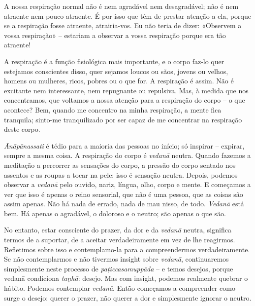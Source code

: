 A nossa respiração normal não é nem agradável nem desagradável; não é nem
atraente nem pouco atraente. É por isso que têm de prestar atenção a ela, porque
se a respiração fosse atraente, atrairia-vos. Eu não teria de dizer: «Observem
a vossa respiração» -- estariam a observar a vossa respiração porque era tão
atraente!

A respiração é a função fisiológica mais importante, e o corpo faz-lo quer
estejamos conscientes disso, quer sejamos loucos ou sãos, jovens ou velhos,
homens ou mulheres, ricos, pobres ou o que for. A respiração é assim. Não é
excitante nem interessante, nem repugnante ou repulsiva. Mas, à medida que nos
concentramos, que voltamos a nossa atenção para a respiração do corpo -- o que
acontece? Bem, quando me concentro na minha respiração, a mente fica tranquila;
sinto-me tranquilizado por ser capaz de me concentrar na respiração deste
corpo.

\emph{Ānāpānassati} é tédio para a maioria das pessoas no início; só inspirar --
expirar, sempre a mesma coisa. A respiração do corpo é \emph{vedanā} neutra.
Quando fazemos a meditação a percorrer as sensações do corpo, a pressão do corpo
sentado nos assentos e as roupas a tocar na pele: isso é sensação neutra.
Depois, podemos observar a \emph{vedanā} pelo ouvido, nariz, língua, olho, corpo
e mente. E começamos a ver que isso é apenas o reino sensorial, que não é uma
pessoa, que as coisas são assim apenas. Não há nada de errado, nada de mau
nisso, de todo. \emph{Vedanā} está bem. Há apenas o agradável, o doloroso e o
neutro; são apenas o que são.

No entanto, estar consciente do prazer, da dor e da \emph{vedanā} neutra,
significa termos de a suportar, de a aceitar verdadeiramente em vez de lhe
reagirmos. Refletimos sobre isso e contemplamo-la para a compreendermos
verdadeiramente. Se não contemplarmos e não tivermos insight sobre
\emph{vedanā}, continuaremos simplesmente neste processo de
\emph{paṭiccasamuppāda} -- e temos desejos, porque vedanā condiciona
\emph{taṇhā}: desejo. Mas com insight, podemos realmente quebrar o hábito.
Podemos contemplar \emph{vedanā}. Então começamos a compreender como surge o
desejo: querer o prazer, não querer a dor e simplesmente ignorar o neutro.

